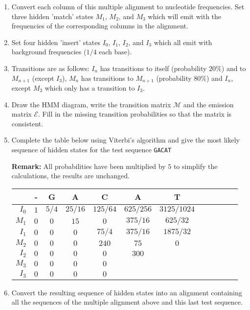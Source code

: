 \documentclass[a4paper,11pt]{article}
\begin{document}
\begin{enumerate}
\item Convert each column of this multiple alignment to nucleotide
  frequencies. Set three hidden 'match' states $M_1$, $M_2$, and $M_3$
  which will emit with the frequencies of the corresponding columns in
  the alignment.
\item Set four hidden 'insert' states $I_0$, $I_1$, $I_2$, and $I_3$ which
  all emit with background frequencies ($1/4$ each base).
\item Transitions are as follows: $I_n$ has transitions to itself
  (probability $20\%$) and to $M_{n+1}$ (except $I_3$), $M_n$ has transitions to
  $M_{n+1}$ (probability $80\%$) and $I_n$, except $M_3$ which only has a transition
  to $I_3$.
\item Draw the HMM diagram, write the transition matrix $\mathcal{M}$ and the
  emission matrix $\mathcal{E}$. Fill in the missing transition probabilities
  so that the matrix is consistent.
\item Complete the table below using Viterbi's algorithm and give the
  most likely sequence of hidden states 
  for the test sequence \texttt{GACAT}

  \textbf{Remark:} All
  probabilities have been multiplied by $5$ to simplify the
  calculations, the results are unchanged.  
\begin{table}[h]
  \begin{center}
    \begin{tabular}{rccccccccccc}
      \toprule
      & - & G & A & C & A & T \\
      \midrule
      $I_0$&$1$&$5/4$&$25/16$&$125/64$&$625/256$&$3125/1024$\\
      $M_1$&$0$&$0  $&$15   $&$0     $&$375/16 $&$625/32   $\\
      $I_1$&$0$&$0  $&$0    $&$75/4  $&$375/16 $&$1875/32  $\\
      $M_2$&$0$&$0  $&$0    $&$240   $&$75     $&$0        $\\
      $I_2$&$0$&$0  $&$0    $&$0     $&$300    $&$    $\\
      $M_3$&$0$&$0  $&$0    $&$0     $&$       $&$     $\\
      $I_3$&$0$&$0  $&$0    $&$0     $&$       $&$        $\\
      \bottomrule
    \end{tabular}
  \end{center}
\end{table}

\item Convert the resulting sequence of hidden states into an
  alignment containing all the sequences of the multiple alignment
  above and this last test sequence.
\end{enumerate}
\end{document}
